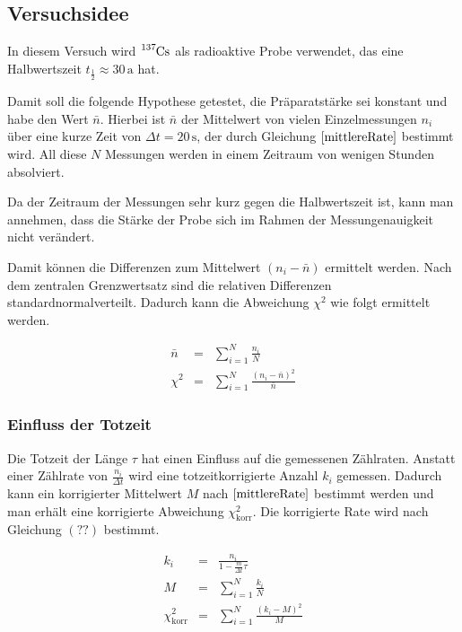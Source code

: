 \documentclass[12pt,a4paper]{scrartcl}
\numberwithin{equation}{section} %
\renewcommand{\[}{} %
\renewcommand{\]}{\noindent} %
\begin{document}
\hypertarget{versuchsidee}{%
\subsection{Versuchsidee}\label{versuchsidee}}

In diesem Versuch wird \(\ce{^{137}Cs}\) als radioaktive Probe
verwendet, das eine Halbwertszeit \(t_\frac{1}{2}\approx 30\,\mathrm a\)
hat.

Damit soll die folgende Hypothese getestet, die Präparatstärke sei
konstant und habe den Wert \(\bar n\). Hierbei ist \(\bar n\) der
Mittelwert von vielen Einzelmessungen \(n_i\) über eine kurze Zeit von
\(\Delta t=20\,\mathrm s\), der durch Gleichung \(\eqref{mittlereRate}\)
bestimmt wird. All diese \(N\) Messungen werden in einem Zeitraum von
wenigen Stunden absolviert.

Da der Zeitraum der Messungen sehr kurz gegen die Halbwertszeit ist,
kann man annehmen, dass die Stärke der Probe sich im Rahmen der
Messungenauigkeit nicht verändert.

Damit können die Differenzen zum Mittelwert \((n_i-\bar n)\) ermittelt
werden. Nach dem zentralen Grenzwertsatz sind die relativen Differenzen
standardnormalverteilt. Dadurch kann die Abweichung \(\chi^2\) wie folgt
ermittelt werden.

\[
\begin{eqnarray}
    \bar n &=& \sum_{i=1}^N \frac{n_i}{N} \label{mittlereRate} \\
    \chi^2 &=& \sum_{i=1}^N \frac{(n_i-\bar n)^2}{\bar n} \label{ChiSquared}
\end{eqnarray}
\]

\hypertarget{einfluss-der-totzeit}{%
\subsubsection{Einfluss der Totzeit}\label{einfluss-der-totzeit}}

Die Totzeit der Länge \(\tau\) hat einen Einfluss auf die gemessenen
Zählraten. Anstatt einer Zählrate von \(\frac{n_i}{\Delta t}\) wird eine
totzeitkorrigierte Anzahl \(k_i\) gemessen. Dadurch kann ein
korrigierter Mittelwert \(M\) nach \(\eqref{mittlereRate}\) bestimmt
werden und man erhält eine korrigierte Abweichung
\(\chi^2_\mathrm{korr}\). Die korrigierte Rate wird nach Gleichung
\((??)\) bestimmt.

\[
\begin{eqnarray}
    k_i &=&
        \frac{
            n_i
        }{
            1 - \frac{m}{\Delta t}\tau
        } \label{korrRate} \\
    M &=& \sum_{i=1}^N \frac{k_i}{N} \label{korrAVG} \\
    \chi^2_\mathrm{korr} &=& \sum_{i=1}^N
        \frac{(k_i - M)^2}{M} \label{ChiKorrDef}
\end{eqnarray}
\]
\end{document}
